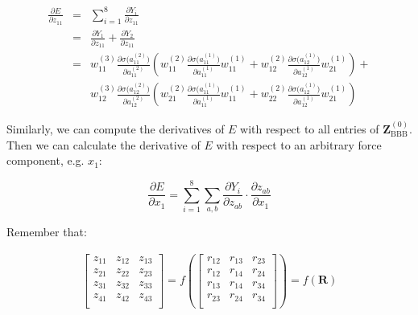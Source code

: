 \documentclass{article}
\begin{document}
\begin{eqnarray}
\frac{\partial{E}}{\partial{z_{11}}} 
& = &
\sum_{i=1}^8{
	\frac{\partial{Y_i}}{\partial{z_{11}}}
} \nonumber \\
& = &
\frac{\partial{Y_1}}{\partial{z_{11}}} + \frac{\partial{Y_2}}{\partial{z_{11}}} \\
& = & 
w^{(3)}_{11}\frac{\partial{\sigma(a_{11}^{(2)}})}{\partial{a_{11}^{(2)}}} 
\left(
	w_{11}^{(2)}\frac{\partial{\sigma(a_{11}^{(1)}})}{\partial{a_{11}^{(1)}}}w^{(1)}_{11} +
	w_{12}^{(2)}\frac{\partial{\sigma(a_{12}^{(1)}})}{\partial{a_{12}^{(1)}}}w^{(1)}_{21}  
\right) + \nonumber \\
&& 
w^{(3)}_{12}\frac{\partial{\sigma(a_{12}^{(2)}})}{\partial{a_{12}^{(2)}}} 
\left(
	w_{21}^{(2)}\frac{\partial{\sigma(a_{11}^{(1)}})}{\partial{a_{11}^{(1)}}}w^{(1)}_{11} +
	w_{22}^{(2)}\frac{\partial{\sigma(a_{12}^{(1)}})}{\partial{a_{12}^{(1)}}}w^{(1)}_{21}  
\right)
\end{eqnarray} 

\noindent Similarly, we can compute the derivatives of $E$ with respect to all entries of 
$\mathbf{Z}^{(0)}_{\mathrm{BBB}}$. Then we can calculate the derivative of $E$ with respect 
to an arbitrary force component, e.g. $x_1$:

\begin{equation}\label{dE_dYdz_dzdx}
\frac{\partial{E}}{\partial{x_1}} = \sum_{i=1}^{8}{
	\sum_{a,b}{
		\frac{\partial{Y_{i}}}{\partial{z_{ab}}} 
		\cdot 
		\frac{\partial{z_{ab}}}{\partial{x_{1}}}
	}
}
\end{equation}

\noindent Remember that:

\begin{eqnarray}
\left[\begin{array}{ccc}
	z_{11} & z_{12}   & z_{13}   \\
	z_{21} & z_{22}   & z_{23}   \\
	z_{31} & z_{32}   & z_{33}   \\
	z_{41} & z_{42}   & z_{43}   \\
\end{array}\right] =
f(\left[\begin{array}{ccc}
	r_{12} & r_{13}   & r_{23}   \\
	r_{12} & r_{14}   & r_{24}   \\
	r_{13} & r_{14}   & r_{34}   \\
	r_{23} & r_{24}   & r_{34}   \\
\end{array}
\right]) = f(\mathbf{R})
\end{eqnarray}
\end{document}
